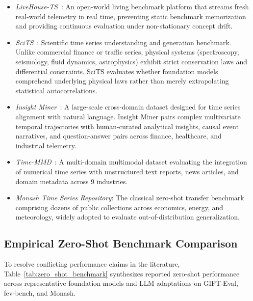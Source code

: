 \begin{itemize}[leftmargin=*]
    \item \emph{LiveHouse-TS}~\cite{wen2026livehouse}: An open-world living benchmark platform that streams fresh real-world telemetry in real time, preventing static benchmark memorization and providing continuous evaluation under non-stationary concept drift.
    \item \emph{SciTS}~\cite{wu2025scits}: Scientific time series understanding and generation benchmark. Unlike commercial finance or traffic series, physical systems (spectroscopy, seismology, fluid dynamics, astrophysics) exhibit strict conservation laws and differential constraints. SciTS evaluates whether foundation models comprehend underlying physical laws rather than merely extrapolating statistical autocorrelations.
    \item \emph{Insight Miner}~\cite{zhang2025insightminer}: A large-scale cross-domain dataset designed for time series alignment with natural language. Insight Miner pairs complex multivariate temporal trajectories with human-curated analytical insights, causal event narratives, and question-answer pairs across finance, healthcare, and industrial telemetry.
    \item \emph{Time-MMD}~\cite{yue2024timemmd}: A multi-domain multimodal dataset evaluating the integration of numerical time series with unstructured text reports, news articles, and domain metadata across 9 industries.
    \item \emph{Monash Time Series Repository}: The classical zero-shot transfer benchmark comprising dozens of public collections across economics, energy, and meteorology, widely adopted to evaluate out-of-distribution generalization.
\end{itemize}

\subsection{Empirical Zero-Shot Benchmark Comparison}
\label{sec:empirical_table}

To resolve conflicting performance claims in the literature, Table~\ref{tab:zero_shot_benchmark} synthesizes reported zero-shot performance across representative foundation models and LLM adaptations on GIFT-Eval, fev-bench, and Monash.

